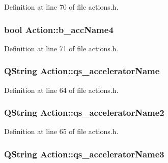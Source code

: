 Definition at line 70 of file actions.h.

\hypertarget{classAction_a2b5a8aa9b8c0fc0946ac3bcf00077187}{
\subsubsection[{b\_\-accName4}]{\setlength{\rightskip}{0pt plus 5cm}bool {\bf Action::b\_\-accName4}}}
\label{classAction_a2b5a8aa9b8c0fc0946ac3bcf00077187}


Definition at line 71 of file actions.h.

\hypertarget{classAction_abab75a630d429f44376a2516801dcd60}{
\subsubsection[{qs\_\-acceleratorName}]{\setlength{\rightskip}{0pt plus 5cm}QString {\bf Action::qs\_\-acceleratorName}}}
\label{classAction_abab75a630d429f44376a2516801dcd60}


Definition at line 64 of file actions.h.

\hypertarget{classAction_ad9bc287f7970ac64d5ffc111c15147cb}{
\subsubsection[{qs\_\-acceleratorName2}]{\setlength{\rightskip}{0pt plus 5cm}QString {\bf Action::qs\_\-acceleratorName2}}}
\label{classAction_ad9bc287f7970ac64d5ffc111c15147cb}


Definition at line 65 of file actions.h.

\hypertarget{classAction_a43c9708f64c0b502c379454a6f10f72d}{
\subsubsection[{qs\_\-acceleratorName3}]{\setlength{\rightskip}{0pt plus 5cm}QString {\bf Action::qs\_\-acceleratorName3}}}
\label{classAction_a43c9708f64c0b502c379454a6f10f72d}


